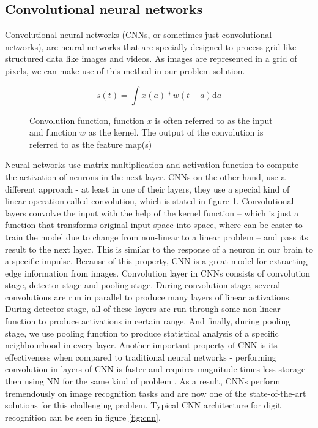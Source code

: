     \subsection{Convolutional neural networks}
    Convolutional neural networks (CNNs, or sometimes just convolutional networks), are neural networks that are specially designed to process grid-like structured data like images and videos. As images are represented in a grid of pixels, we can make use of this method in our problem solution.
    \newline
    \begin{figure}
        \[ s(t) = \int x(a) * w(t - a) \mathrm{d}a \]
        \caption[Convolution function]{Convolution function, function $x$ is often referred to as the input and function $w$ as the kernel. The output of the convolution is referred to as the feature map(s)}
        \label{fig:conv_function}
    \end{figure}
    Neural networks use matrix multiplication and activation function to compute the activation of neurons in the next layer. CNNs on the other hand, use a different approach - at least in one of their layers, they use a special kind of linear operation called convolution, which is stated in figure \ref{fig:conv_function}.
    Convolutional layers convolve the input with the help of the kernel function -- which is just a function that transforms original input space into space, where can be easier to train the model due to change from non-linear to a linear problem -- and pass its result to the next layer. This is similar to the response of a neuron in our brain to a specific impulse. Because of this property, CNN is a great model for extracting edge information from images. Convolution layer in CNNs consists of convolution stage, detector stage and pooling stage. During convolution stage, several convolutions are run in parallel to produce many layers of linear activations. During detector stage, all of these layers are run through some non-linear function to produce activations in certain range. And finally, during pooling stage, we use pooling function to produce statistical analysis of a specific neighbourhood in every layer.
    \newline
    Another important property of CNN is its effectiveness when compared to traditional neural networks - performing convolution in layers of CNN is faster and requires magnitude times less storage then using NN for the same kind of problem \cite{deep-learning}. As a result, CNNs perform tremendously on image recognition tasks and are now one of the state-of-the-art solutions for this challenging problem. Typical CNN architecture for digit recognition can be seen in figure \ref{fig:cnn}.
